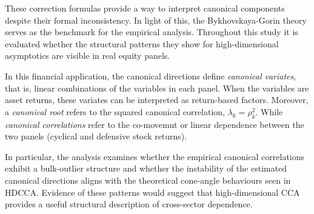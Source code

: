 \documentclass[12pt]{report} %
\begin{document}
These correction formulas provide a way to interpret canonical components despite their 
formal inconsistency. In light of this, the Bykhovskaya-Gorin theory serves as the 
benchmark for the  empirical analysis. 
Throughout this study it is evaluated whether the structural patterns they show for high-dimensional 
asymptotics are visible in real equity panels. 

In this financial application, the canonical directions define \emph{canonical variates}, 
that is, linear combinations of the variables in each panel. When the variables are asset 
returns, these variates can be interpreted as return-based factors.
Moreover, a \emph{canonical root} refers to the squared canonical correlation, \(\lambda_k = \rho_k^2\).
While \emph{canonical correlations} refer to the co-movemnt or linear dependence between 
the two panels (cyclical and defensive stock returns).

In particular, the analysis examines whether the empirical canonical correlations exhibit a 
bulk-outlier structure and whether the instability of the estimated canonical directions 
aligns with the theoretical cone-angle behaviours seen in HDCCA. Evidence of these patterns would suggest that high-dimensional CCA 
provides a useful structural description of cross-sector dependence.


\end{document}
